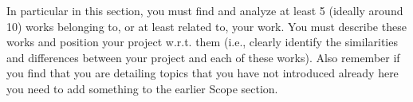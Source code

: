 In particular in this section, you must find and analyze at least 5 (ideally around 10) works belonging to, or at least related to, your work. You must describe these works and position your project w.r.t. them (i.e., clearly identify the similarities and differences between your project and each of these works). Also remember if you find that you are detailing topics that you have not introduced already here you need to add something to the earlier Scope section.